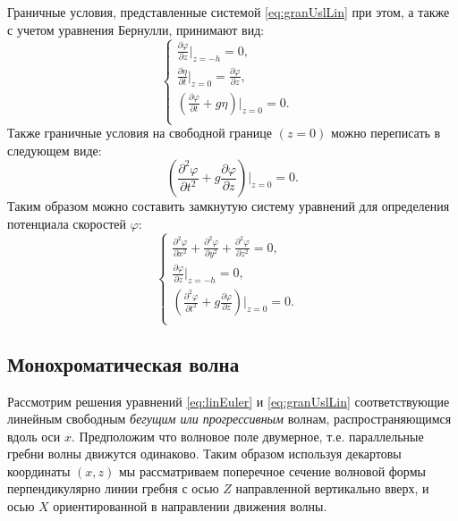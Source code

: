 Граничные условия, представленные системой \eqref{eq:granUslLin} при этом, а также с учетом уравнения Бернулли, принимают вид:
\begin{equation}\label{eq:granUslLin1}
\begin{cases}
    \frac{\partial \varphi}{\partial z}|_{z=-h}=0, &\\
    \frac{\partial \eta}{\partial t}|_{z=0}=\frac{\partial \varphi}{\partial z},&\\
    (\frac{\partial \varphi}{\partial t}+ g\eta)|_{z=0}=0.&\\
\end{cases}
\end{equation}
Также граничные условия на свободной границе $(z=0)$ можно переписать в следующем виде:
\begin{equation}\label{eq:granUslLin2}
    (\frac{\partial^2 \varphi}{\partial t^2}+ g\frac{\partial \varphi}{\partial z})|_{z=0}=0.
\end{equation}
Таким образом можно составить замкнутую систему уравнений для определения потенциала скоростей $\varphi$:
\begin{equation}\label{eq:granUslLin1}
\begin{cases}
    \frac{\partial^2 \varphi}{\partial x^2}+\frac{\partial^2 \varphi}{\partial y^2}+\frac{\partial^2 \varphi}{\partial z^2}=0, &\\
    \frac{\partial \varphi}{\partial z}|_{z=-h}=0, &\\
    (\frac{\partial^2 \varphi}{\partial t^2}+ g\frac{\partial \varphi}{\partial z})|_{z=0}=0. &\\
\end{cases}
\end{equation}

\subsection{Монохроматическая волна}
Рассмотрим решения уравнений \eqref{eq:linEuler} и \eqref{eq:granUslLin} соответствующие линейным свободным \emph{бегущим или прогрессивным} волнам, распространяющимся вдоль оси $x$. Предположим что волновое поле двумерное, т.е. параллельные гребни волны движутся одинаково. Таким образом используя декартовы координаты $(x,z)$ мы рассматриваем поперечное сечение волновой формы перпендикулярно линии гребня с осью $Z$ направленной вертикально вверх, и осью $X$ ориентированной в направлении движения волны.

